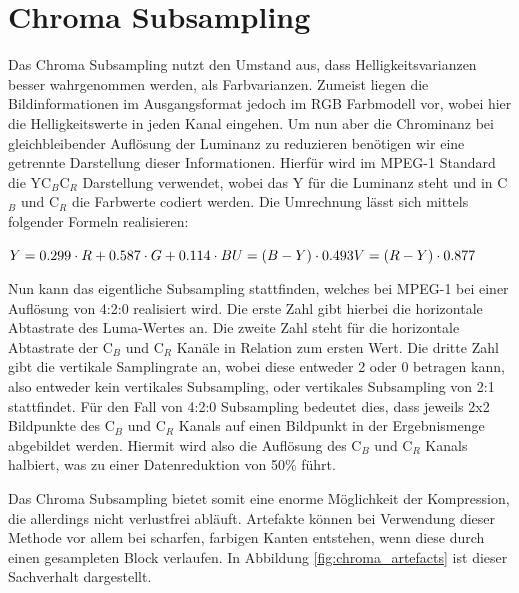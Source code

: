 \section{Chroma Subsampling}

Das Chroma Subsampling nutzt den Umstand aus, dass Helligkeitsvarianzen besser wahrgenommen werden, als Farbvarianzen. Zumeist liegen die Bildinformationen im Ausgangsformat jedoch im RGB Farbmodell vor, wobei hier die Helligkeitswerte in jeden Kanal eingehen. Um nun aber die Chrominanz bei gleichbleibender Auflösung der Luminanz zu reduzieren benötigen wir eine getrennte Darstellung dieser Informationen. Hierfür wird im MPEG-1 Standard die YC$_B$C$_R$ Darstellung verwendet, wobei das Y für die Luminanz steht und in C$_B$ und C$_R$ die Farbwerte codiert werden. Die Umrechnung lässt sich mittels folgender Formeln realisieren:

$
Y = 0.299 \cdot R + 0.587 \cdot G + 0.114 \cdot B \\
U = (B - Y) \cdot 0.493 \\
V = (R - Y) \cdot 0.877
$
\cite{itu-t_recommendation_1995}

Nun kann das eigentliche Subsampling stattfinden, welches bei MPEG-1 bei einer Auflösung von 4:2:0 realisiert wird. Die erste Zahl gibt hierbei die horizontale Abtastrate des Luma-Wertes an. Die zweite Zahl steht für die horizontale Abtastrate der C$_B$ und C$_R$ Kanäle in Relation zum ersten Wert. Die dritte Zahl gibt die vertikale Samplingrate an, wobei diese entweder 2 oder 0 betragen kann, also entweder kein vertikales Subsampling, oder vertikales Subsampling von 2:1 stattfindet. Für den Fall von 4:2:0 Subsampling bedeutet dies, dass jeweils 2x2 Bildpunkte des C$_B$ und C$_R$ Kanals auf einen Bildpunkt in der Ergebnismenge abgebildet werden. Hiermit wird also die Auflösung des C$_B$ und C$_R$ Kanals halbiert, was zu einer Datenreduktion von 50\% führt. \cite{poynton_chroma_????} %

Das Chroma Subsampling bietet somit eine enorme Möglichkeit der Kompression, die allerdings nicht verlustfrei abläuft. Artefakte können bei Verwendung dieser Methode vor allem bei scharfen, farbigen Kanten entstehen, wenn diese durch einen gesampleten Block verlaufen. In Abbildung \ref{fig:chroma_artefacts} ist dieser Sachverhalt dargestellt. %

